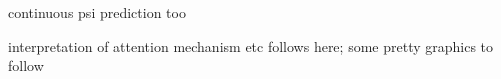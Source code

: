 continuous psi prediction too







interpretation of attention mechanism etc follows here; some pretty graphics to follow








%


